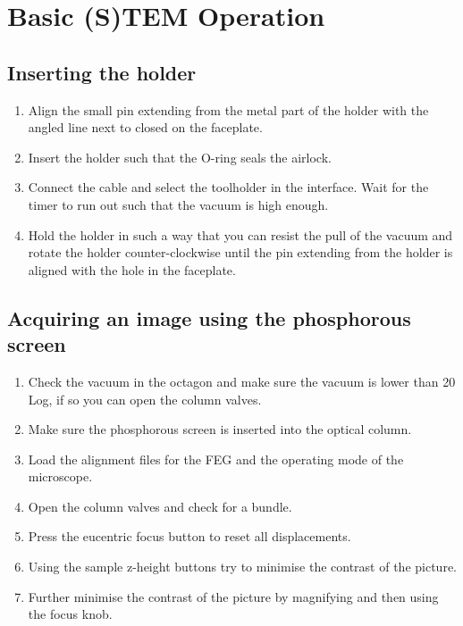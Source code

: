 \documentclass[a4paper]{scrartcl}
\begin{document}
\section*{Basic (S)TEM Operation}

\subsection*{Inserting the holder}
\begin{enumerate}
	\item Align the small pin extending from the metal part of the holder with the angled line next to closed on the faceplate.
	\item Insert the holder such that the O-ring seals the airlock.
	\item Connect the cable and select the toolholder in the interface. Wait for the timer to run out such that the vacuum is high enough.
	\item Hold the holder in such a way that you can resist the pull of the vacuum and rotate the holder counter-clockwise until the pin extending from the holder is aligned with the hole in the faceplate.
\end{enumerate}


\subsection*{Acquiring an image using the phosphorous screen}
\begin{enumerate}
	\item Check the vacuum in the octagon and make sure the vacuum is lower than 20 Log, if so you can open the column valves.
	\item Make sure the phosphorous screen is inserted into the optical column.
	\item Load the alignment files for the FEG and the operating mode of the microscope.
	\item Open the column valves and check for a bundle.
	\item Press the eucentric focus button to reset all displacements.
	\item Using the sample z-height buttons try to minimise the contrast of the picture.
	\item Further minimise the contrast of the picture by magnifying and then using the focus knob.
\end{enumerate}
\end{document}
